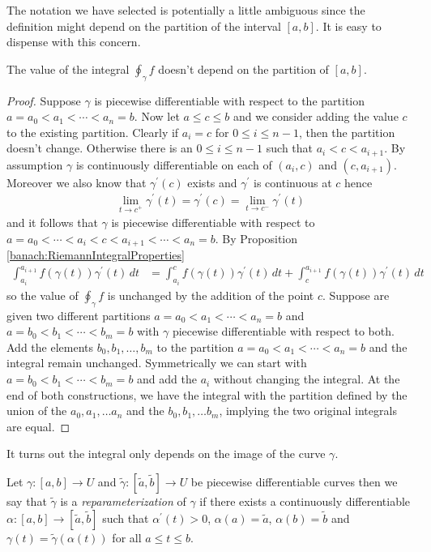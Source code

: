 The notation we have selected is potentially a little ambiguous since the definition might depend on the partition of the interval $[a,b]$.   It is easy to dispense with this concern.
\begin{prop}The value of the integral $\oint_\gamma f$ doesn't depend on the partition of $[a,b]$.
\end{prop} 
\begin{proof}
  Suppose $\gamma$ is piecewise differentiable with respect to the partition $a = a_0 < a_1 < \cdots < a_n = b$.  Now let $a \leq c \leq b$ and we consider adding the value $c$ to the existing partition.   Clearly if $a_i=c$ for $0 \leq i \leq n-1$, then the partition doesn't change.   Otherwise there is an $0 \leq i \leq n-1$ such that $a_i < c < a_{i+1}$.   By assumption $\gamma$ is continuously differentiable on each of $(a_i, c)$ and $(c, a_{i+1})$.   Moreover we also know that $\gamma^\prime(c)$ exists and $\gamma^\prime$ is continuous at $c$ hence
  \begin{align*}
    \lim_{t \to c^+} \gamma^\prime(t) = \gamma^\prime(c) = \lim_{t \to c^-} \gamma^\prime(t)
  \end{align*}
and it follows that $\gamma$ is piecewise differentiable with respect to $a = a_0 < \cdots < a_i < c < a_{i+1} < \cdots < a_n = b$.
  By Proposition \ref{banach:RiemannIntegralProperties}
\begin{align*}
\int_{a_i}^{a_{i+1}} f(\gamma(t)) \gamma^\prime(t) \, dt &= \int_{a_i}^c f(\gamma(t)) \gamma^\prime(t) \, dt + \int_c^{a_{i+1}} f(\gamma(t)) \gamma^\prime(t) \, dt
\end{align*}
so the value of $\oint_\gamma f$ is unchanged by the addition of the point $c$.   Suppose are given two different partitions $a = a_0 < a_1 < \cdots < a_n = b$ and $a = b_0 < b_1 < \cdots < b_m = b$ with $\gamma$ piecewise differentiable with respect to both.   Add the elements $b_0, b_1, \dots, b_m$ to the partition $a = a_0 < a_1 < \cdots < a_n = b$ and the integral remain unchanged.   Symmetrically we can start with $a = b_0 < b_1 < \cdots < b_m = b$ and add the $a_i$ without changing the integral.   At the end of both constructions, we have the integral with the partition defined by the union of the $a_0, a_1, \dots a_n$ and the $b_0, b_1, \dots b_m$, implying the two original integrals are equal.
\end{proof}

It turns out the integral only depends on the image of the curve $\gamma$. 
\begin{defn}Let $\gamma : [a,b] \to U$ and $\tilde{\gamma} : [\tilde{a}, \tilde{b}] \to U$ be piecewise differentiable curves then we say that $\tilde{\gamma}$ is a \emph{reparameterization} of $\gamma$ if there exists a continuously differentiable $\alpha : [a,b] \to [\tilde{a}, \tilde{b}]$ such that $\alpha^\prime(t) > 0$, $\alpha(a) = \tilde{a}$, $\alpha(b) = \tilde{b}$ and $\gamma(t) = \tilde{\gamma}(\alpha(t))$ for all $a \leq t \leq b$.
\end{defn}

